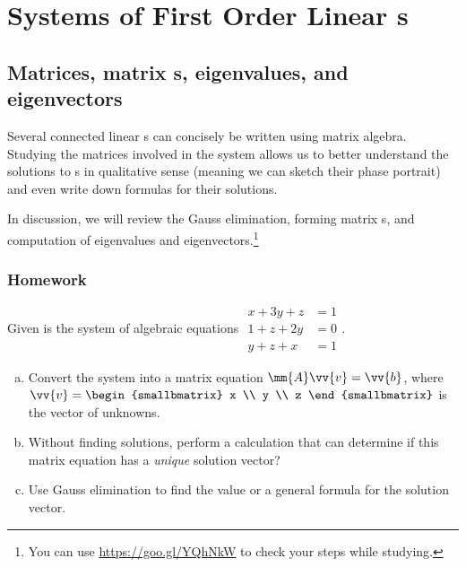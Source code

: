 \chapter{Systems of First Order Linear \ode{}s}


\section{Matrices, matrix \ode{}s, eigenvalues, and eigenvectors}

\begin{weekintro}
Several connected linear \ode{}s can concisely be written using matrix algebra. Studying the matrices involved in the system allows us to better understand the solutions to \ode{}s in qualitative sense (meaning we can sketch their phase portrait) and even write down formulas for their solutions.

In discussion, we will review the Gauss elimination, forming matrix \ode{}s, and computation of eigenvalues and eigenvectors.\footnote{You can use \url{https://goo.gl/YQhNkW} to check your steps while studying.}
\end{weekintro}

\subsection*{Homework}

\begin{question}
  Given is the system of algebraic equations \quad\quad \(
  \begin{aligned}
    x + 3y +z  &= 1 \\
    1 + z + 2y &= 0 \\
    y+z+x &= 1
  \end{aligned}
\).
\begin{enumerate}[(a)]
  \item Convert the system into a matrix equation \(\mm{A} \vv{v} = \vv{b}\), where \(\vv{v} =
    \begin{smallbmatrix}
      x \\ y \\ z
    \end{smallbmatrix}
    \) is the vector of unknowns.
    \solspace{1.5in}
\item Without finding solutions, perform a calculation that can determine if this matrix equation has a \emph{unique} solution vector?
  \solspace{2in}
\item Use Gauss elimination to find the value or a general formula for the solution vector.
  \solspace{2in}
\end{enumerate}
\end{question}

